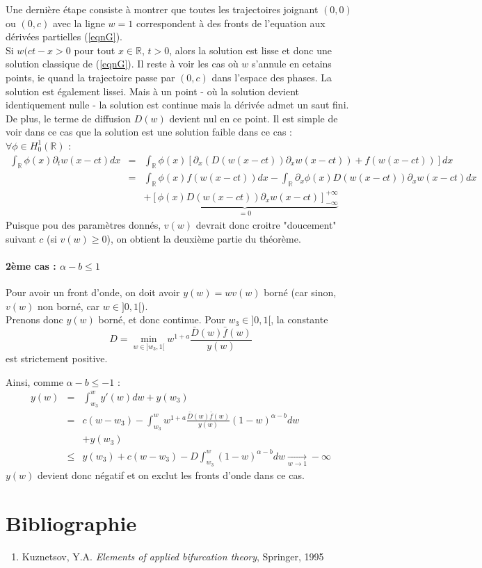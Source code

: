 \documentclass{article}
\begin{document}
\bigskip
Une dernière étape consiste à montrer que toutes les trajectoires joignant $(0,0)$ ou $(0,c)$ avec la ligne $w=1$ correspondent à des fronts de l'equation aux dérivées partielles (\ref{eqnG}).\\
Si $w(ct-x>0$ pour tout $x\in \mathbb{R}$, $t>0$, alors la solution est lisse et donc une solution classique de (\ref{eqnG}). Il reste à voir les cas où $w$ s'annule en cetains points, ie quand la trajectoire passe par $(0,c)$ dans l'espace des phases. La solution est également lissei. Mais à un point - où la solution devient identiquement nulle - la solution est continue mais la dérivée admet un saut fini. De plus, le terme de diffusion $D(w)$ devient nul en ce point. Il est simple de voir dans ce cas que la solution est une solution faible dans ce cas :\\
$\forall \phi\in H_0^1(\mathbb{R})$ :
\begin{eqnarray*}
	\int_{\mathbb{R}} \phi(x)\partial_t w(x-ct)dx &=&\int_{\mathbb{R}} \phi(x) \left[ \partial_x \left( D(w(x-ct))\partial_x w(x-ct)\right) +f(w(x-ct))\right]dx\\
						&=& \int_{\mathbb{R}} \phi(x) f(w(x-ct)) dx - \int_{\mathbb{R}} \partial_x \phi(x) D(w(x-ct))\partial_x w(x-ct)dx \\
						& & + \underbrace{\left[ \phi(x)D(w(x-ct))\partial_x w(x-ct)\right]_{-\infty}^{+\infty}}_{=0}
\end{eqnarray*}
Puisque pou des paramètres donnés, $v(w)$ devrait donc croitre "doucement" suivant $c$ (si $v(w)\geq 0$), on obtient la deuxième partie du théorème.

\paragraph{2ème cas : $\alpha-b\leq 1$}
Pour avoir un front d'onde, on doit avoir $y(w)=wv(w)$ borné (car sinon, $v(w)$ non borné, car $w\in ]0,1[$).\\
Prenons donc $y(w)$ borné, et donc continue. Pour $w_3\in]0,1[$, la constante \[D=\min_{w\in ]w_3,1[} w^{1+a} \frac{\bar{D}(w)\bar{f}(w)}{y(w)}\] est strictement positive.

Ainsi, comme $\alpha-b\leq -1$ : 
\begin{eqnarray*}
	y(w)&=&\int_{w_3}^w y'(w)dw + y(w_3)\\
		&=& c(w-w_3)-\int_{w_3}^w w^{1+a} \frac{\bar{D}(w)\bar{f}(w)}{y(w)} (1-w)^{\alpha-b} dw \\& &+ y(w_3)\\
		&\leq& y(w_3)+c(w-w_3) -D \int_{w_3}^w (1-w)^{\alpha-b} dw \xrightarrow[w\to 1]{} -\infty
\end{eqnarray*}
$y(w)$ devient donc négatif et on exclut les fronts d'onde dans ce cas.


\appendix
\section{Bibliographie}
\begin{enumerate}
	\item \label{bib1} Kuznetsov, Y.A. \textit{Elements of applied bifurcation theory}, Springer, 1995
\end{enumerate}
\end{document}
